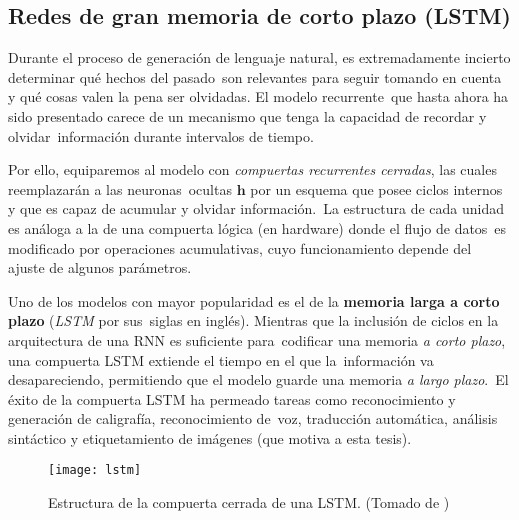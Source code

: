 \subsection{Redes de gran memoria de corto plazo (LSTM)}

Durante el proceso de generación de lenguaje natural, es extremadamente incierto determinar qué hechos del pasado\
son relevantes para seguir tomando en cuenta y qué cosas valen la pena ser olvidadas. El modelo recurrente\
que hasta ahora ha sido presentado carece de un mecanismo que tenga la capacidad de recordar y olvidar\
información durante intervalos de tiempo.\par
Por ello, equiparemos al modelo con \emph{compuertas recurrentes cerradas}, las cuales reemplazarán a las neuronas\
ocultas $\mathbf{h}$ por un esquema que posee ciclos internos y que es capaz de acumular y olvidar información.\
La estructura de cada unidad es análoga a la de una compuerta lógica (en hardware) donde el flujo de datos\
es modificado por operaciones acumulativas, cuyo funcionamiento depende del ajuste de algunos parámetros.\par
Uno de los modelos con mayor popularidad es el de la \textbf{memoria larga a corto plazo} (\emph{LSTM} por sus\
siglas en inglés). Mientras que la inclusión de ciclos en la arquitectura de una RNN es suficiente para\
codificar una memoria \emph{a corto plazo}, una compuerta LSTM extiende el tiempo en el que la\
información va desapareciendo, permitiendo que el modelo guarde una memoria \emph{a largo plazo}.\
El éxito de la compuerta LSTM ha permeado tareas como reconocimiento y generación de caligrafía, reconocimiento de\
voz, traducción automática, análisis sintáctico y etiquetamiento de imágenes (que motiva a esta tesis).

\begin{figure}
  \centering
  \texttt{[image: lstm]}
  \caption{Estructura de la compuerta cerrada de una LSTM.
    (Tomado de \cite{goodfellow-et-al-2016})}
  \label{lstm_fig}
\end{figure}

